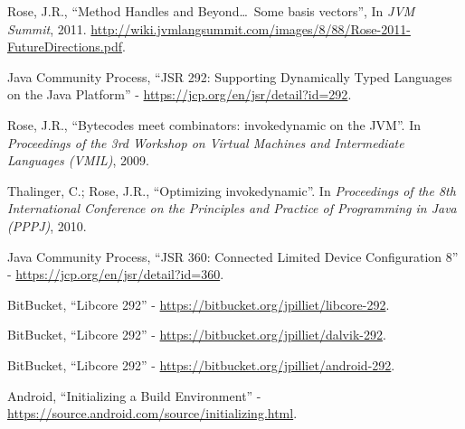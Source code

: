\documentclass{sig-alternate}
\begin{document}
\begin{thebibliography}{}
  Rose, J.R., ``Method Handles and Beyond\dots~Some basis vectors'', In {\it JVM Summit}, 2011. \url{http://wiki.jvmlangsummit.com/images/8/88/Rose-2011-FutureDirections.pdf}.

  Java Community Process, ``JSR 292: Supporting Dynamically Typed Languages on the Java{\scriptsize\texttrademark} Platform'' - \url{https://jcp.org/en/jsr/detail?id=292}.

  Rose, J.R., ``Bytecodes meet combinators: invokedynamic on the JVM''. In {\it Proceedings of the 3rd Workshop on Virtual Machines and Intermediate Languages (VMIL)}, 2009.

  Thalinger, C.; Rose, J.R., ``Optimizing invokedynamic''. In {\it Proceedings of the 8th International Conference on the Principles and Practice of Programming in Java (PPPJ)}, 2010.

  Java Community Process, ``JSR 360: Connected Limited Device Configuration 8'' - \url{https://jcp.org/en/jsr/detail?id=360}.

  BitBucket, ``Libcore 292'' - \url{https://bitbucket.org/jpilliet/libcore-292}.

  BitBucket, ``Libcore 292'' - \url{https://bitbucket.org/jpilliet/dalvik-292}.

  BitBucket, ``Libcore 292'' - \url{https://bitbucket.org/jpilliet/android-292}.

  Android, ``Initializing a Build Environment'' - \url{https://source.android.com/source/initializing.html}.

\end{thebibliography}
\end{document}
